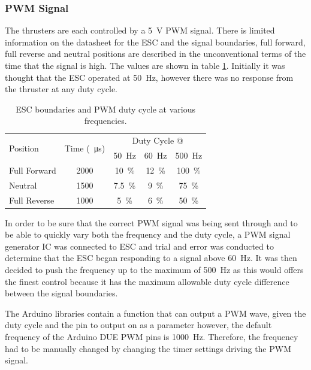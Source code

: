 		\subsubsection{PWM Signal}
		The thrusters are each controlled by a \SI{5}{\volt} PWM signal. There is limited information on the datasheet for the ESC and the signal boundaries, full forward, full reverse and neutral positions are described in the unconventional terms of the time that the signal is high. The values are shown in table \ref{tab:3:PWM}. Initially it was thought that the ESC operated at \SI{50}{\hertz}, however there was no response from the thruster at any duty cycle.\par
		\begin{table}[!ht]
			\begin{center}
				\caption{ESC boundaries and PWM duty cycle at various frequencies.}
				\label{tab:3:PWM}
				\begin{tabular}{|l|c|c|c|c|}
					\hline
					\multirow{2}{*}{Position} & \multirow{2}{*}{Time (\SI{}{\micro\second})} & \multicolumn{3}{c|}{Duty Cycle @}\\
					& & \multicolumn{1}{c}{\SI{50}{\hertz}} & \multicolumn{1}{c}{\SI{60}{\hertz}} & \multicolumn{1}{c|}{\SI{500}{\hertz}}\\
					\hline
					Full Forward & 2000 & \SI{10}{\percent} & \SI{12}{\percent} & \SI{100}{\percent}  \\
					\hline
					Neutral & 1500 & \SI{7.5}{\percent} & \SI{9}{\percent} & \SI{75}{\percent}  \\
					\hline
					Full Reverse & 1000 & \SI{5}{\percent} & \SI{6}{\percent} & \SI{50}{\percent}  \\
					\hline
				\end{tabular}
			\end{center}
		\end{table}
		\vspace{0.4cm}
		In order to be sure that the correct PWM signal was being sent through and to be able to quickly vary both the frequency and the duty cycle, a PWM signal generator IC was connected to ESC and trial and error was conducted to determine that the ESC began responding to a signal above \SI{60}{\hertz}. It was then decided to push the frequency up to the maximum of \SI{500}{\hertz} as this would offers the finest control because it has the maximum allowable duty cycle difference between the signal boundaries.\par
		\vspace{0.4cm}
		The Arduino libraries contain a function that can output a PWM wave, given the duty cycle and the pin to output on as a parameter however, the default frequency of the Arduino DUE PWM pins is \SI{1000}{\hertz}. Therefore, the frequency had to be manually changed by changing the timer settings driving the PWM signal.\par
